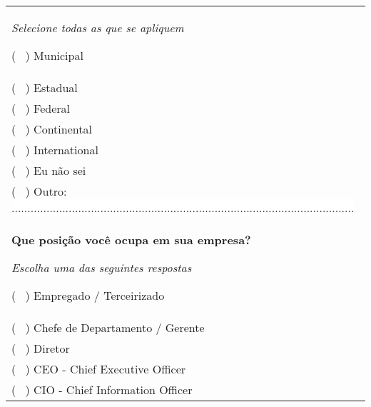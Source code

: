 \begin{tabularx}{\textwidth}{|X|}
\begin{Spacing}{2.0}
		\tiny \textit{Selecione todas as que se apliquem} \end{Spacing} 
	( \ ) Municipal \\
	( \ ) Estadual \\
	( \ ) Federal \\
	( \ ) Continental \\
	( \ ) International \\
	( \ ) Eu não sei \\
	( \ ) Outro: \colorbox{white}{ ............................................................................................................ } \\
	\begin{Spacing}{0.8} \end{Spacing}
	\begin{Spacing}{0.8} 
		\textbf{Que posição você ocupa em sua empresa?} \end{Spacing} 
	\begin{Spacing}{2.0} 
		\tiny \textit{Escolha uma das seguintes respostas} \end{Spacing} 
	( \ ) Empregado / Terceirizado \\
	( \ ) Chefe de Departamento / Gerente \\
	( \ ) Diretor \\
	( \ ) CEO - Chief Executive Officer \\
	( \ ) CIO - Chief Information Officer \\
  \hline
\end{tabularx}

\bigskip

